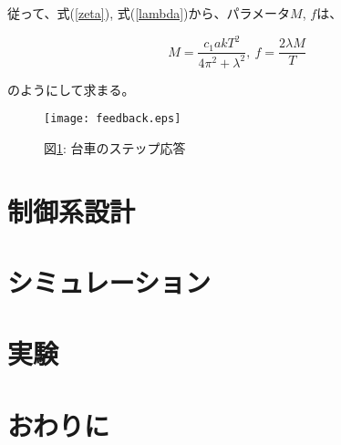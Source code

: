\documentclass[a4j,11pt,twoside]{jbook}
\begin{document}
\begin{enumerate}
\begin{itemize}
        従って、式(\ref{zeta}), 式(\ref{lambda})から、パラメータ$M$, $f$は、

        \begin{equation}
            M = \frac{c_{1}akT^2}{4\pi^2 + \lambda^2},\
            f = \frac{2\lambda M}{T}
        \end{equation}

        のようにして求まる。



        \begin{figure}[htbp]
            \begin{center}
                \texttt{[image: feedback.eps]}
                \caption{図\ref{feedback}: 台車のステップ応答}
                \label{feedback}
            \end{center}
        \end{figure}

    \end{itemize}
\end{enumerate}



\chapter{制御系設計}




\chapter{シミュレーション}



\chapter{実験}



\chapter{おわりに}





\end{document}
